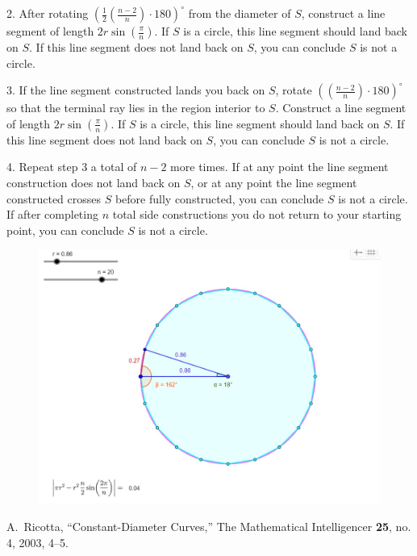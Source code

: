\documentclass[11pt]{amsart}
\theoremstyle{plain}
\theoremstyle{definition}
\theoremstyle{remark}
\begin{document}
2. After rotating \((\frac{1}{2}(\frac{n-2}{n})\cdot 180)^{\circ}\) from the diameter of \(S\), construct a line segment of length \(2r\sin\left( \frac{\pi}{n} \right)\).  If \(S\) is a circle, this line segment should land back on \(S\).  If this line segment does not land back on \(S\), you can conclude \(S\) is not a circle.





3. If the line segment constructed lands you back on \(S\), rotate \(((\frac{n-2}{n})\cdot 180)^{\circ}\) so that the terminal ray lies in the region interior to \(S\).  Construct a line segment of length \(2r\sin\left( \frac{\pi}{n} \right)\).  If \(S\) is a circle, this line segment should land back on \(S\).  If this line segment does not land back on \(S\), you can conclude \(S\) is not a circle. 





4. Repeat step 3 a total of \(n-2\) more times.  If at any point the line segment construction does not land back on \(S\), or at any point the line segment constructed crosses \(S\) before fully constructed, you can conclude \(S\) is not a circle.  If after completing \(n\) total side constructions you do not return to your starting point, you can conclude \(S\) is not a circle.
\begin{center}
	\begin{figure}[h]
		\includegraphics[scale=0.29]{circle_7.jpg}
	\end{figure}
\end{center}

\begin{thebibliography}{9}
 A.\ Ricotta, ``Constant-Diameter Curves,'' The Mathematical
Intelligencer \textbf{25}, no. 4, 2003, 4--5.
\end{thebibliography}
\end{document}
